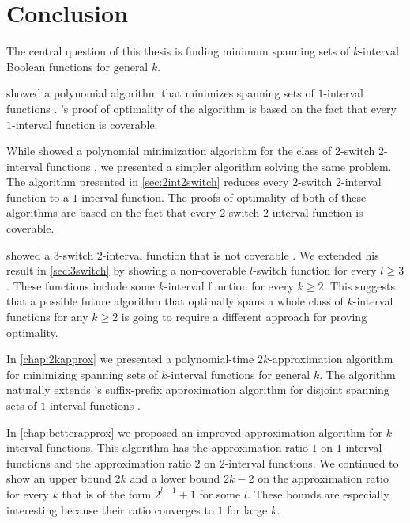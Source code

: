 \chapter*{Conclusion}

The central question of this thesis
is finding minimum spanning sets
of $k$-interval Boolean functions
for general $k$.

\citeauthor{Schieber2005154} showed a polynomial algorithm
that minimizes spanning sets of $1$-interval functions
\citep[Section 3]{Schieber2005154}.
\citeauthor{Schieber2005154}'s proof of optimality
of the algorithm
is based on the fact that every $1$-interval function
is coverable.

While \citeauthor{Dubovsky2012} showed
a polynomial minimization algorithm
for the class of $2$-switch $2$-interval functions
\citep[Section 4]{Dubovsky2012},
we presented a simpler algorithm
solving the same problem.
The algorithm presented in \cref{sec:2int2switch}
reduces every $2$-switch $2$-interval function
to a $1$-interval function.
The proofs of optimality of both of these algorithms
are based on the fact that every $2$-switch $2$-interval
function is coverable.

\citeauthor{Dubovsky2012} showed
a $3$-switch $2$-interval function
that is not coverable
\citep[p.~32]{Dubovsky2012}.
We extended his result
in \cref{sec:3switch}
by showing
a non-coverable $l$-switch function for every $l \geq 3$.
These functions include some $k$-interval function
for every $k \geq 2$.
This suggests that a possible future algorithm
that optimally spans a whole class
of $k$-interval functions
for any $k \geq 2$
is going to require a different approach
for proving optimality.

In \cref{chap:2kapprox}
we presented
a polynomial-time
$2k$-approximation algorithm
for minimizing spanning sets
of $k$-interval functions for general $k$.
The algorithm naturally extends
\citeauthor{Schieber2005154}'s suffix-prefix
approximation algorithm
for disjoint spanning sets of $1$-interval functions
\citep[Section 6]{Schieber2005154}.

In \cref{chap:betterapprox}
we proposed an improved approximation algorithm
for $k$-interval functions.
This algorithm has the approximation ratio $1$
on $1$-interval functions
and the approximation ratio $2$
on $2$-interval functions.
We continued to show an upper bound $2k$
and a lower bound $2k-2$
on the approximation ratio
for every $k$ that is of the form $2^{l-1}+1$
for some $l$.
These bounds are especially interesting
because their ratio converges to $1$
for large $k$.

